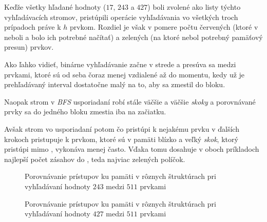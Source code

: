 Keďže všetky hľadané hodnoty ($17$, $243$ a $427$) boli zvolené ako listy týchto vyhľadávacích stromov, pristúpili operácie vyhľadávania vo všetkých troch prípadoch práve k $h$ prvkom. Rozdiel je však v pomere počtu červených (ktoré v \cache neboli a bolo ich potrebné načítať) a zelených (na ktoré nebol potrebný pamäťový presun) prvkov.

Ako ľahko vidieť, binárne vyhľadávanie začne v strede a presúva sa medzi prvkami, ktoré sú od seba  čoraz menej vzdialené až do momentu, kedy už je prehľadávaný interval dostatočne malý na to, aby sa zmestil do bloku.

Naopak strom v \emph{BFS} usporiadaní robí stále väčšie a väčšie \emph{skoky} a porovnávané prvky sa do jedného bloku zmestia iba na začiatku.

Avšak strom vo \vEB usporiadaní potom čo pristúpi k nejakému prvku v ďalších krokoch pristupuje k prvkom, ktoré sú v pamäti blízko a veľký \emph{skok}, ktorý pristúpi mimo \cache, vykonáva menej často. Vďaka tomu dosahuje v oboch príkladoch najlepší počet zásahov do \cache, teda najviac zelených políčok.

%


\begin{sidewaysfigure}
    \centering
    \caption[Porovnávanie prístupov ku pamäti pri vyhľadávaní hodnoty $243$]{Porovnávanie prístupov ku pamäti v rôznych štruktúrach pri vyhľadávaní hodnoty $243$ medzi $511$ prvkami}
    \label{fig:search_comparison1}

    \vspace*{2cm} %
        
    \caption[Porovnávanie prístupov ku pamäti pri vyhľadávaní hodnoty $427$]{Porovnávanie prístupov ku pamäti v rôznych štruktúrach pri vyhľadávaní hodnoty $427$ medzi $511$ prvkami}
    \label{fig:search_comparison2}
\end{sidewaysfigure}


